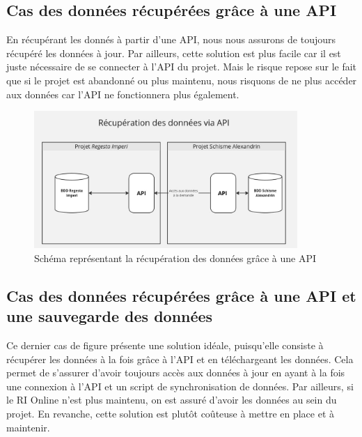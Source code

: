     \subsection{Cas des données récupérées grâce à une API}

En récupérant les donnés à partir d'une API, nous nous assurons de toujours récupéré les données à jour. Par ailleurs, cette solution est plus facile car il est juste nécessaire de se connecter à l'API du projet. Mais le risque repose sur le fait que si le projet est abandonné ou plus maintenu, nous risquons de ne plus accéder aux données car l'API ne fonctionnera plus également.\\

\begin{figure}[H]
    \centering
    \includegraphics[width=10cm]{images/recup-donnees-api.jpg}
    \caption{Schéma représentant la récupération des données grâce à une API}
    \label{fig:schemaAPI}
\end{figure}

    \subsection{Cas des données récupérées grâce à une API et une sauvegarde des données}

Ce dernier cas de figure présente une solution idéale, puisqu'elle consiste à récupérer les données à la fois grâce à l'API et en téléchargeant les données. Cela permet de s'assurer d'avoir toujours accès aux données à jour en ayant à la fois une connexion à l'API et un script de synchronisation de données. Par ailleurs, si le RI Online n'est plus maintenu, on est assuré d'avoir les données au sein du projet. En revanche, cette solution est plutôt coûteuse à mettre en place et à maintenir.\\

